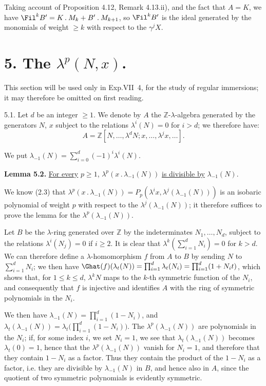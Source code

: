 Taking account of Proposition 4.12, Remark 4.13.ii), and the fact that \(A=K\), we have \(\Fil^k B'=K\mathbin{.} M_k+B'\mathbin{.} M_{k+1}\), so \(\Fil^k B'\) is the ideal generated by the monomials of weight \(\ge k\) with respect to the \(\gamma^j X\).

\section*{5. The \(\lambda^p(N,x)\).}

This section will be used only in Exp.VII~4, for the study of regular immersions; it may therefore be omitted on first reading.

5.1. Let \(d\) be an integer \(\ge1\). We denote by \(A\) the \(\mathbb Z\)-\(\lambda\)-algebra generated by the generators \(N\), \(x\) subject to the relations \(\lambda^i(N)=0\) for \(i>d\); we therefore have:
\[
  A=\mathbb Z[N,\ldots,\lambda^dN;
       x,\ldots,\lambda^jx,\ldots].
\]

We put \(\lambda_{-1}(N)=\sum_{i=0}^{d}(-1)^i\lambda^i(N)\).

\textbf{Lemma 5.2.} \uline{For every} \(p\ge1\), \(\lambda^p(x\mathbin{.}\lambda_{-1}(N))\) \uline{is divisible by} \(\lambda_{-1}(N)\).

We know (2.3) that \(\lambda^p(x\mathbin{.}\lambda_{-1}(N))=P_p(\lambda^i x,\lambda^j(\lambda_{-1}(N)))\) is an isobaric polynomial of weight \(p\) with respect to the \(\lambda^j(\lambda_{-1}(N))\); it therefore suffices to prove the lemma for the \(\lambda^p(\lambda_{-1}(N))\).

Let \(B\) be the \(\lambda\)-ring generated over \(\mathbb Z\) by the indeterminates \(N_1,\ldots,N_d\), subject to the relations \(\lambda^i(N_j)=0\) if \(i\ge2\). It is clear that \(\lambda^k(\sum_{i=1}^{d}N_i)=0\) for \(k>d\). We can therefore define a \(\lambda\)-homomorphism \(f\) from \(A\) to \(B\) by sending \(N\) to \(\sum_{i=1}^{d}N_i\); we then have \(\Ghat(f)(\lambda_t(N))=\prod_{i=1}^{d}\lambda_t(N_i)=\prod_{i=1}^{d}(1+N_it)\),
%
which shows that, for \(1\le k\le d\), \(\lambda^k N\) maps to the \(k\)-th symmetric function of the \(N_i\), and consequently that \(f\) is injective and identifies \(A\) with the ring of symmetric polynomials in the \(N_i\).

We then have \(\lambda_{-1}(N)=\prod_{i=1}^{d}(1-N_i)\), and \(\lambda_t(\lambda_{-1}(N))=\lambda_t\bigl(\prod_{i=1}^{d}(1-N_i)\bigr)\). The \(\lambda^p(\lambda_{-1}(N))\) are polynomials in the \(N_i\); if, for some index \(i\), we set \(N_i=1\), we see that \(\lambda_t(\lambda_{-1}(N))\) becomes \(\lambda_t(0)=1\), hence that the \(\lambda^p(\lambda_{-1}(N))\) vanish for \(N_i=1\), and therefore that they contain \(1-N_i\) as a factor. Thus they contain the product of the \(1-N_i\) as a factor, i.e. they are divisible by \(\lambda_{-1}(N)\) in \(B\), and hence also in \(A\), since the quotient of two symmetric polynomials is evidently symmetric.

